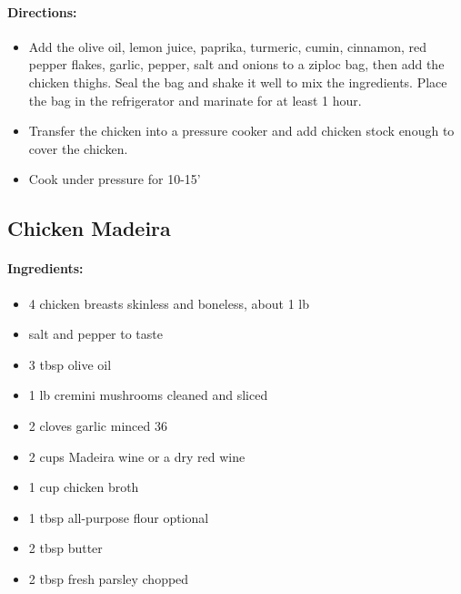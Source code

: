 \documentclass{article}
\begin{document}
\paragraph{Directions:}
\begin{itemize}
	\item Add the olive oil, lemon juice, paprika, turmeric, cumin, cinnamon, red pepper flakes, garlic, pepper, salt and onions to a ziploc bag, then add the chicken thighs. Seal the bag and shake it well to mix the ingredients. Place the bag in the refrigerator and marinate for at least 1 hour.
	\item Transfer the chicken into a pressure cooker and add chicken stock enough to cover the chicken.
	\item Cook under pressure for 10-15'
\end{itemize}

\subsection{Chicken Madeira}

\paragraph{Ingredients:}
\begin{itemize}
	\item 4 chicken breasts skinless and boneless, about 1 lb
	\item salt and pepper to taste
	\item 3 tbsp olive oil
	\item 1 lb cremini mushrooms cleaned and sliced
	\item 2 cloves garlic minced
	36  \item 2 cups Madeira wine or a dry red wine
	\item 1 cup chicken broth
	\item 1 tbsp all-purpose flour optional
	\item 2 tbsp butter
	\item 2 tbsp fresh parsley chopped
\end{itemize}
\end{document}
